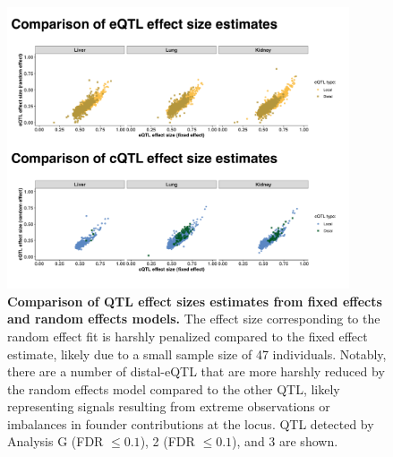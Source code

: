 \documentclass[9pt,twocolumn,twoside]{gsajnl}
\begin{document}
\begin{figure}[h]
\centering
\includegraphics[width=0.9\textwidth, trim={0in 0in 0in 0in}, clip]{figs/fixefvsranef_qtl.pdf}
\caption{\textbf{Comparison of QTL effect sizes estimates from fixed effects and random effects models.} The effect size corresponding to the random effect fit is harshly penalized compared to the fixed effect estimate, likely due to a small sample size of 47 individuals. Notably, there are a number of distal-eQTL that are more harshly reduced by the random effects model compared to the other QTL, likely representing signals resulting from extreme observations or imbalances in founder contributions at the locus. QTL detected by Analysis G (FDR $\le 0.1$), 2 (FDR $\le 0.1$), and 3 are shown.
\label{fig:qtl_effect_size_fixefvsranef}}
\end{figure}
\end{document}
